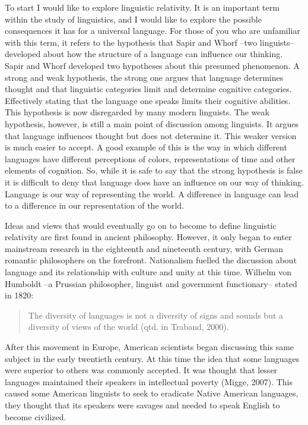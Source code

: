 To start I would like to explore linguistic relativity. It is an important term within the study of linguistics, and I would like to explore the possible consequences it has for a universal language. For those of you who are unfamiliar with this term, it refers to the hypothesis that Sapir and Whorf --two linguists-- developed about how the structure of a language can influence our thinking. Sapir and Whorf developed two hypotheses about this presumed phenomenon. A strong and weak hypothesis, the strong one argues that language determines thought and that linguistic categories limit and determine cognitive categories. Effectively stating that the language one speaks limits their cognitive abilities. This hypothesis is now disregarded by many modern linguists. The weak hypothesis, however, is still a main point of discussion among linguists. It argues that language influences thought but does not determine it. This weaker version is much easier to accept. A good example of this is the way in which different languages have different perceptions of colors, representations of time and other elements of cognition. So, while it is safe to say that the strong hypothesis is false it is difficult to deny that language does have an influence on our way of thinking. Language is our way of representing the world. A difference in language can lead to a difference in our representation of the world. 

 
	Ideas and views that would eventually go on to become to define linguistic relativity are first found  in ancient philosophy. However, it only began to enter mainstream research in the eighteenth and nineteenth century, with German romantic philosophers on the forefront. Nationalism fuelled the discussion about language and its relationship with culture and unity at this time. Wilhelm von Humboldt --a Prussian philosopher, linguist and government functionary-- stated in 1820:  

\begin{quote}
\begin{singlespace}
The diversity of languages is not a diversity of signs and sounds but a diversity of views of the world (qtd. in Traband, 2000). 
\end{singlespace}
\end{quote}

After this movement in Europe, American scientists began discussing this same subject in the early twentieth century. At this time the idea that some languages were superior to others was commonly accepted. It was thought that lesser languages maintained their speakers in intellectual poverty (Migge, 2007). This caused some American linguists to seek to eradicate Native American languages, they thought that its speakers were savages and needed to speak English to become civilized. 

